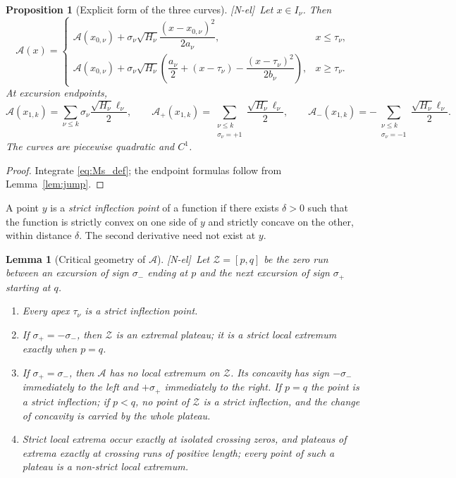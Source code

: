 \documentclass[11pt]{amsart}
\numberwithin{equation}{section}
\theoremstyle{plain}
\newtheorem{proposition}[theorem]{Proposition}
\newtheorem{lemma}[theorem]{Lemma}
\theoremstyle{definition}
\theoremstyle{remark}
\newcommand{\Ap}{\mathcal{A}_{+}}
\newcommand{\Am}{\mathcal{A}_{-}}
\newcommand{\Anet}{\mathcal{A}}
\newcommand{\tagNE}{\textup{[N-el]}}
\begin{document}
\begin{proposition}[Explicit form of the three curves]
\label{prop:explicit}
\tagNE\ Let $x\in I_\nu$. Then
\begin{equation}
\label{eq:explicit_A}
\Anet(x)=
\begin{cases}
\Anet(x_{0,\nu})+\sigma_\nu\sqrt{H_\nu}
\dfrac{(x-x_{0,\nu})^2}{2a_\nu},&x\le\tau_\nu,\\[2ex]
\Anet(x_{0,\nu})+\sigma_\nu\sqrt{H_\nu}
\left(\dfrac{a_\nu}{2}+(x-\tau_\nu)-
\dfrac{(x-\tau_\nu)^2}{2b_\nu}\right),&x\ge\tau_\nu.
\end{cases}
\end{equation}
At excursion endpoints,
\begin{equation}
\label{eq:explicit_net}
\Anet(x_{1,k})=\sum_{\nu\le k}\sigma_\nu\frac{\sqrt{H_\nu}\ell_\nu}{2},\qquad
\Ap(x_{1,k})=\sum_{\substack{\nu\le k\\\sigma_\nu=+1}}
\frac{\sqrt{H_\nu}\ell_\nu}{2},\qquad
\Am(x_{1,k})=-\sum_{\substack{\nu\le k\\\sigma_\nu=-1}}
\frac{\sqrt{H_\nu}\ell_\nu}{2}.
\end{equation}
The curves are piecewise quadratic and $C^1$.
\end{proposition}

\begin{proof}
Integrate \eqref{eq:Ms_def}; the endpoint formulas follow from
Lemma~\ref{lem:jump}.
\end{proof}

A point $y$ is a \emph{strict inflection point} of a function if there
exists $\delta>0$ such that the function is strictly convex on one side of
$y$ and strictly concave on the other, within distance $\delta$. The second
derivative need not exist at $y$.

\begin{lemma}[Critical geometry of $\Anet$]
\label{lem:critical}
\tagNE\ Let $\mathcal Z=[p,q]$ be the zero run between an excursion of sign $\sigma_-$ ending
at $p$ and the next excursion of sign $\sigma_+$ starting at $q$.
\begin{enumerate}[label=\textup{(\roman*)}]
\item Every apex $\tau_\nu$ is a strict inflection point.
\item If $\sigma_+=-\sigma_-$, then $\mathcal Z$ is an extremal plateau; it is a
strict local extremum exactly when $p=q$.
\item If $\sigma_+=\sigma_-$, then $\Anet$ has no local extremum on
$\mathcal Z$. Its concavity has sign $-\sigma_-$ immediately to the left
and $+\sigma_+$ immediately to the right. If $p=q$ the point is a strict inflection; if
$p<q$, no point of $\mathcal Z$ is a strict inflection, and the change of concavity
is carried by the whole plateau.
\item Strict local extrema occur exactly at isolated crossing zeros, and
plateaus of extrema exactly at crossing runs of positive length; every point
of such a plateau is a non-strict local extremum.
\end{enumerate}
\end{lemma}
\end{document}
